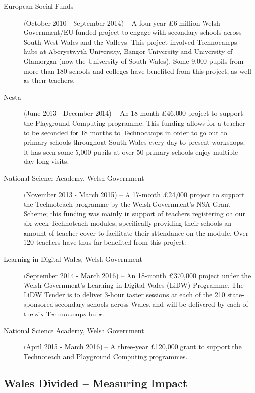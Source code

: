 \documentclass{sig-alternate}
\begin{document}
\begin{description}
\item[European Social Funds] (October 2010 - September 2014) --
A four-year \pounds 6 million Welsh Government/EU-funded project to
engage with secondary schools across South West Wales and the
Valleys. This project involved Technocamps hubs at Aberystwyth
University, Bangor University and University of Glamorgan (now the
University of South Wales). Some 9,000 pupils from more than 180
schools and colleges have benefited from this project, as well as
their teachers.

\item[Nesta] (June 2013 - December 2014) --
An 18-month \pounds 46,000 project to support the Playground Computing
programme. This funding allows for a teacher to be seconded for 18
months to Technocamps in order to go out to primary schools throughout
South Wales every day to present workshops. It has seen some 5,000
pupils at over 50 primary schools enjoy multiple day-long visits.

\item[National Science Academy, Welsh Government] (November 2013 - March 2015) --
A 17-month \pounds 24,000 project to support the Technoteach programme
by the Welsh Government's NSA Grant Scheme; this funding was mainly in
support of teachers registering on our six-week Technoteach modules,
specifically providing their schools an amount of teacher cover to
facilitate their attendance on the module. Over 120 teachers have thus
far benefited from this project.

\item[Learning in Digital Wales, Welsh Government] (September 2014 - March 2016) --
An 18-month \pounds 370,000 project under the Welsh Government's
Learning in Digital Wales (LiDW) Programme. The LiDW Tender is to
deliver 3-hour taster sessions at each of the 210 state-sponsored
secondary schools across Wales, and will be delivered by each of the
six Technocamps hubs.

\item[National Science Academy, Welsh Government] (April 2015 - March 2016) -- 
A three-year \pounds 120,000 grant to support the Technoteach and
Playground Computing programmes.
\end{description}

\subsection{Wales Divided -- Measuring Impact}\label{walesdivided}
\end{document}
